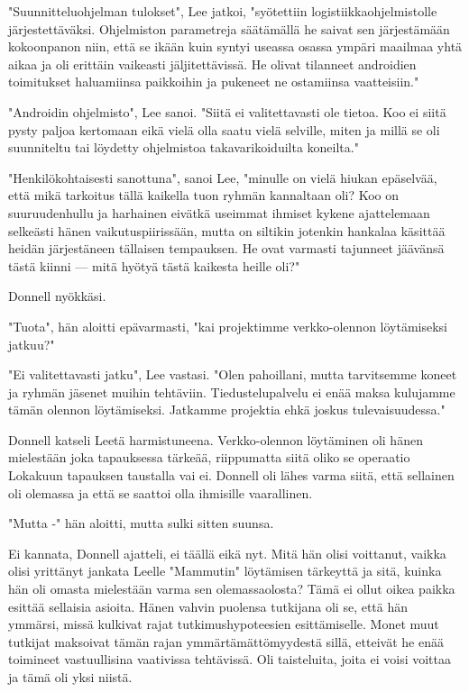 "Suunnitteluohjelman tulokset", Lee jatkoi, "syötettiin logistiikkaohjelmistolle järjestettäväksi. Ohjelmiston parametreja säätämällä he saivat sen järjestämään kokoonpanon niin, että se ikään kuin syntyi useassa osassa ympäri maailmaa yhtä aikaa ja oli erittäin vaikeasti jäljitettävissä. He olivat tilanneet androidien toimitukset haluamiinsa paikkoihin ja pukeneet ne ostamiinsa vaatteisiin."


"Androidin ohjelmisto", Lee sanoi. "Siitä ei valitettavasti ole tietoa. Koo ei siitä pysty paljoa kertomaan eikä vielä olla saatu vielä selville, miten ja millä se oli suunniteltu tai löydetty ohjelmistoa takavarikoiduilta koneilta."


"Henkilökohtaisesti sanottuna", sanoi Lee, "minulle on vielä hiukan epäselvää, että mikä tarkoitus tällä kaikella tuon ryhmän kannaltaan oli? Koo on suuruudenhullu ja harhainen eivätkä useimmat ihmiset kykene ajattelemaan selkeästi hänen vaikutuspiirissään, mutta on siltikin jotenkin hankalaa käsittää heidän järjestäneen tällaisen tempauksen. He ovat varmasti tajunneet jäävänsä tästä kiinni --- mitä hyötyä tästä kaikesta heille oli?"


Donnell nyökkäsi.


"Tuota", hän aloitti epävarmasti, "kai projektimme verkko-olennon löytämiseksi jatkuu?"


"Ei valitettavasti jatku", Lee vastasi. "Olen pahoillani, mutta tarvitsemme koneet ja ryhmän jäsenet muihin tehtäviin. Tiedustelupalvelu ei enää maksa kulujamme tämän olennon löytämiseksi. Jatkamme projektia ehkä joskus tulevaisuudessa."


Donnell katseli Leetä harmistuneena. Verkko-olennon löytäminen oli hänen mielestään joka tapauksessa tärkeää, riippumatta siitä oliko se operaatio Lokakuun tapauksen taustalla vai ei. Donnell oli lähes varma siitä, että sellainen oli olemassa ja että se saattoi olla ihmisille vaarallinen.


"Mutta -" hän aloitti, mutta sulki sitten suunsa.


Ei kannata, Donnell ajatteli, ei täällä eikä nyt. Mitä hän olisi voittanut, vaikka olisi yrittänyt jankata Leelle "Mammutin" löytämisen tärkeyttä ja sitä, kuinka hän oli omasta mielestään varma sen olemassaolosta? Tämä ei ollut oikea paikka esittää sellaisia asioita. Hänen vahvin puolensa tutkijana oli se, että hän ymmärsi, missä kulkivat rajat tutkimushypoteesien esittämiselle. Monet muut tutkijat maksoivat tämän rajan ymmärtämättömyydestä sillä, etteivät he enää toimineet vastuullisina vaativissa tehtävissä. Oli taisteluita, joita ei voisi voittaa ja tämä oli yksi niistä.


